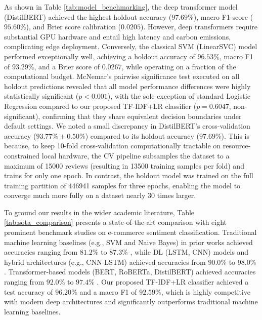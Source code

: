 \documentclass[authoryear,review,3p,times,12pt]{elsarticle}
\begin{document}
As shown in Table \ref{tab:model_benchmarking}, the deep transformer model (DistilBERT) achieved the highest holdout accuracy ($97.69\%$), macro F1-score ($95.60\%$), and Brier score calibration ($0.0205$). However, deep transformers require substantial GPU hardware and entail high latency and carbon emissions, complicating edge deployment. Conversely, the classical SVM (LinearSVC) model performed exceptionally well, achieving a holdout accuracy of $96.53\%$, macro F1 of $93.29\%$, and a Brier score of $0.0267$, while operating on a fraction of the computational budget. McNemar's pairwise significance test executed on all holdout predictions revealed that all model performance differences were highly statistically significant ($p < 0.001$), with the sole exception of standard Logistic Regression compared to our proposed TF-IDF+LR classifier ($p = 0.6047$, non-significant), confirming that they share equivalent decision boundaries under default settings. We noted a small discrepancy in DistilBERT's cross-validation accuracy ($93.77\% \pm 0.50\%$) compared to its holdout accuracy ($97.69\%$). This is because, to keep 10-fold cross-validation computationally tractable on resource-constrained local hardware, the CV pipeline subsamples the dataset to a maximum of 15000 reviews (resulting in 13500 training samples per fold) and trains for only one epoch. In contrast, the holdout model was trained on the full training partition of 446941 samples for three epochs, enabling the model to converge much more fully on a dataset nearly 30 times larger.

To ground our results in the wider academic literature, Table \ref{tab:sota_comparison} presents a state-of-the-art comparison with eight prominent benchmark studies on e-commerce sentiment classification. Traditional machine learning baselines (e.g., SVM and Naive Bayes) in prior works achieved accuracies ranging from $81.2\%$ to $87.3\%$ \citep{fang2015sentiment, ali2024analyzing}, while DL (LSTM, CNN) models and hybrid architectures (e.g., CNN-LSTM) achieved accuracies from $90.0\%$ to $98.0\%$ \citep{zhang2015characterlevel, sorour2024hybrid, mamyrbayev2026enhanced}. Transformer-based models (BERT, RoBERTa, DistilBERT) achieved accuracies ranging from $92.0\%$ to $97.4\%$ \citep{ali2024analyzing, duru2025transformer, daraghmi2026sentiment, khan2026assessing}. Our proposed TF-IDF+LR classifier achieved a test accuracy of $96.20\%$ and a macro F1 of $92.59\%$, which is highly competitive with modern deep architectures and significantly outperforms traditional machine learning baselines.
\end{document}
